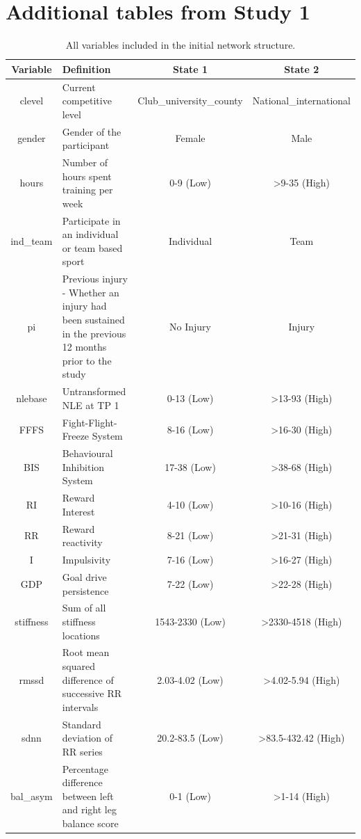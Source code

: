 \documentclass[man,floatsintext]{apa6}
\begin{document}
\hypertarget{additional-tables-from-study-1}{%
\section{Additional tables from Study 1}\label{additional-tables-from-study-1}}


\begin{longtable}[t]{c>{\raggedright\arraybackslash}p{5cm}cc}
\caption{\label{tab:cutoffvalues}All variables included in the initial network structure.}\\
\toprule
Variable & Definition & State 1 & State 2\\
\midrule
clevel & Current competitive level & Club\_university\_county & National\_international\\
gender & Gender of the participant & Female & Male\\
hours & Number of hours spent training per week & 0-9 (Low) & >9-35 (High)\\
ind\_team & Participate in an individual or team based sport & Individual & Team\\
pi & Previous injury - Whether an injury had been sustained in the previous 12 months prior to the study & No Injury & Injury\\
nlebase & Untransformed NLE at TP 1 & 0-13 (Low) & >13-93 (High)\\
FFFS & Fight-Flight-Freeze System & 8-16 (Low) & >16-30 (High)\\
BIS & Behavioural Inhibition System & 17-38 (Low) & >38-68 (High)\\
RI & Reward Interest & 4-10 (Low) & >10-16 (High)\\
RR & Reward reactivity & 8-21 (Low) & >21-31 (High)\\
I & Impulsivity & 7-16 (Low) & >16-27 (High)\\
GDP & Goal drive persistence & 7-22 (Low) & >22-28 (High)\\
stiffness & Sum of all stiffness locations & 1543-2330 (Low) & >2330-4518 (High)\\
rmssd & Root mean squared difference of successive RR intervals & 2.03-4.02 (Low) & >4.02-5.94 (High)\\
sdnn & Standard deviation of RR series & 20.2-83.5 (Low) & >83.5-432.42 (High)\\
bal\_asym & Percentage difference between left and right leg balance score & 0-1 (Low) & >1-14 (High)\\

\end{longtable}
\end{document}
